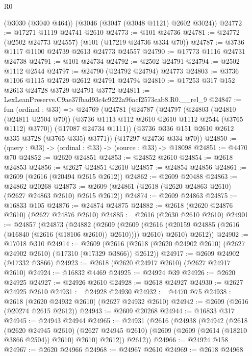 \begin{lexlean}{R0}
\begin{coremodule}
    (@3030 (@3040 @464))
    (@3046 (@3047 (@3048 @1121) @2602 @3024))
@24772 := @17271 @1119 @24741 @2610
@24773 := @101 @24736
@24781 := @24772 (@2502 @24773 @24557) (@101 (@17219 @24736 @334 @70))
@24787 := @3736 @1117 @1100 @24739 @2613 @24773 @24557
@24790 := @17773 @1116 @24731 @24738
@24791 := @101 @24734
@24792 := @2502 @24791
@24794 := @2502 @1112 @2544
@24797 := @24790 (@24792 @24794) @24773
@24803 := @3736 @1106 @1115 @24729 @2612 @24791 @24794
@24810 := @17253 @317 @152 @2613 @24728 @3729 @24791 @3772
@24811 := LexLeanPreserve.C9ae37fbad93c4c9222a96acf2573cab8.R0.__rel_9
@24847 := fun (ordinal : @33) =>
  @24769
    (@24781
      (@24787
        (@24797
          (@24803
            (@24810 (@24811 @2504 @70))
            (@3736 @1113 @112 @2610 @2610 @1112 @2544 (@3765 @1112) @3770))
          (@17087 @24734 @1111))
        (@3736 @336 @151 @2610 @2612 @335 @3728 (@3765 @335) @3771))
      (@17297 @24736 @334 @70))
@24850 := (query : @33) -> (ordinal : @33) -> (source : @33) -> @18098
@24851 := @4470 @70
@24852 := @2620 @24851
@24853 := @24852 @2610
@24854 := @2618 @24853
@24856 := @2627 @24851 @2610
@24857 := @24854 @24856
@24861 := @2609 (@2616 (@20494 @2615 @2612))
@24862 := @2609 @20488
@24863 := @24862 @20268
@24873 := @2609 (@24861 (@2618 (@2620 @24863 @2610) (@2627 @24863 @2610) @2615 @2612))
@24874 := @2609 @24863
@24875 := @16833 @105
@24876 := @24874 @24875
@24882 := @2618 (@2620 @24876 @2610) (@2627 @24876 @2610)
@24885 := @2616 (@2630 @2610 @2610)
@24901 := @24857
    (@24873
      (@24882
        (@2609
          (@2609 (@2616 (@20159 @24885 (@2616 (@16840 (@2616 (@18106 @2610)) @2610)))) @2610)
          @2610)
        @2612))
@24902 := @17018 @310
@24914 := @2609
    (@2616 (@2618 (@2620 @24902 @2610) (@2627 @24902 @2610) (@17310 (@17329 @3866)) @2612))
@24917 := @2609 @24902 (@17332 @3866)
@24923 := @2618 (@2620 @24917 @2610) (@2627 @24917 @2610)
@24924 := @16832 @4469
@24925 := @24924 @39
@24926 := @2620 @24925
@24927 := @24926 @2610
@24928 := @2618 @24927
@24930 := @2627 @24925 @2610
@24931 := @24928 @24930
@24932 := @4470 @75
@24938 := @2618 (@2620 @24932 @2610) (@2627 @24932 @2610)
@24942 := @2609 (@2616 (@20274 @2615 @2612))
@24943 := @2609 @20268
@24944 := @16833 @317
@24945 := @24943 @24944
@24965 := @24931
    (@2616
      (@24938
        (@24942
          (@2618
            (@2620 @24945 @2610)
            (@2627 @24945 @2610)
            (@2609 (@2609 (@2614 (@18210 @3866 @2504)) @2610) @2610)
            @2612))
        @2612))
@24966 := @24924 @158
@24967 := @2620 @24966
@24968 := @24967 @2610
@24969 := @2618 @24968

\end{coremodule}
\end{lexlean}
